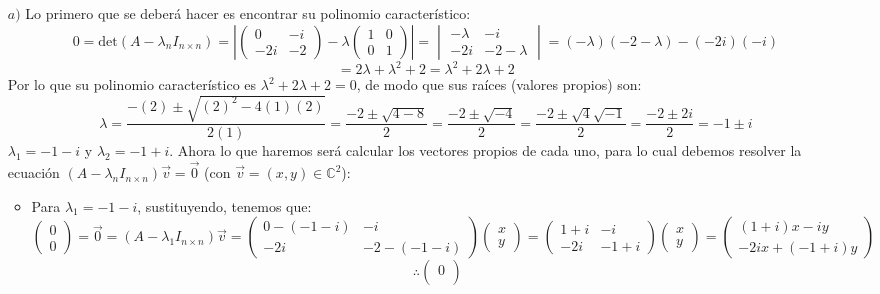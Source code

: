     \begin{enumerate}
        \item[$a)$] Lo primero que se deber\'a hacer es encontrar su polinomio caracter\'istico:
        \[0=\text{det}(A-\lambda_nI_{n\times n })=\left|\begin{pmatrix}0& -i\\
-2i &-2\end{pmatrix}-\lambda\begin{pmatrix}
1 &0\\0 &1
\end{pmatrix}\right|=\begin{vmatrix}-\lambda &-i\\
-2i &-2-\lambda\end{vmatrix}=(-\lambda)(-2-\lambda)-(-2i)(-i)\]\[=2\lambda+\lambda^2+2=\lambda^2+2\lambda+2\]
Por lo que su polinomio caracter\'istico es $\lambda^2+2\lambda+2=0$, de modo que sus ra\'ices (valores propios) son:
\[\lambda= \frac{-(2)\pm\sqrt{(2)^2-4(1)(2)}}{2(1)}= \frac{-2\pm\sqrt{4-8}}{2}= \frac{-2\pm\sqrt{-4}}{2}= \frac{-2\pm\sqrt{4}\sqrt{-1}}{2}= \frac{-2\pm2i}{2}=-1\pm i\]$\lambda_1=-1-i$ y $\lambda_2=-1+i$. Ahora lo que haremos ser\'a calcular los vectores propios de cada uno, para lo cual debemos resolver la ecuaci\'on $(A-\lambda_nI_{n\times n })\vec{v}=\vec{0}$ (con $\vec{v}=(x,y)\in\mathbb{C}^2$):
\begin{itemize}
    \item Para $\lambda_1=-1-i$, sustituyendo, tenemos que:
    \[\begin{pmatrix}0\\
0\end{pmatrix}=\vec{0}=(A-\lambda_1I_{n\times n })\vec{v}=\begin{pmatrix}0-(-1-i) &-i\\
-2i &-2-(-1-i)\end{pmatrix}\begin{pmatrix}x\\
y\end{pmatrix}=\begin{pmatrix}1+i &-i\\
-2i &-1+i\end{pmatrix}\begin{pmatrix}x\\
y\end{pmatrix}=\begin{pmatrix}(1+i)x-iy\\
-2ix+(-1+i)y\end{pmatrix}\]
\[\therefore \begin{pmatrix}0\\

\end{pmatrix}\]
\end{itemize}
\end{enumerate}
